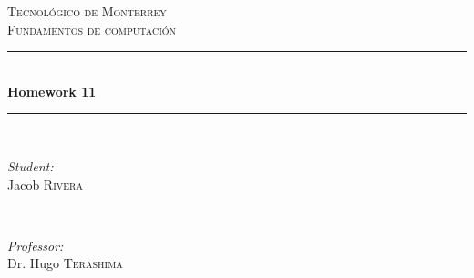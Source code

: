 \documentclass{article}
\begin{document}
\begin{titlepage}

    \newcommand{\HRule}{\rule{\linewidth}{0.5mm}} %

    \center %


    \textsc{\LARGE Tecnológico de Monterrey}\\[1.5cm] %
    \textsc{\Large Fundamentos de computación}\\[0.5cm] %


    \HRule \\[0.4cm]
    { \huge \bfseries Homework 11}\\[0.4cm] %
    \HRule \\[1.5cm]


    \begin{minipage}{0.4\textwidth}
    \begin{flushleft} \large
    \emph{Student:}\\
    Jacob \textsc{Rivera} %
    \end{flushleft}
    \end{minipage}
    ~
    \begin{minipage}{0.4\textwidth}
    \begin{flushright} \large
    \emph{Professor:} \\
    Dr. Hugo \textsc{Terashima} %
    \end{flushright}
    \end{minipage}\\[2cm]


\end{titlepage}
\end{document}
